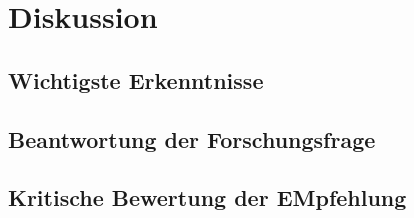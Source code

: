 \chapter{Diskussion}

\section{Wichtigste Erkenntnisse}

\section{Beantwortung der Forschungsfrage}

\section{Kritische Bewertung der EMpfehlung}
